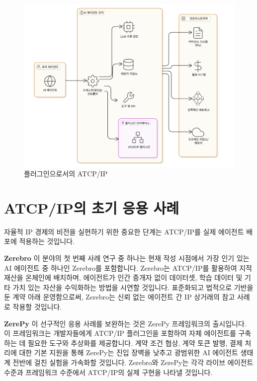 \documentclass[journal,onecolumn]{IEEEtran} %
\begin{document}
\begin{figure}[h!]
    \centering
    \includegraphics[width=\linewidth]{agendacore.png}
    \caption{플러그인으로서의 ATCP/IP}
    \label{fig:atcpip_plugin}
\end{figure}

\section{ATCP/IP의 초기 응용 사례}
자율적 IP 경제의 비전을 실현하기 위한 중요한 단계는 ATCP/IP를 실제 에이전트 배포에 적용하는 것입니다.

\noindent\textbf{Zerebro}
이 분야의 첫 번째 사례 연구 중 하나는 현재 작성 시점에서 가장 인기 있는 AI 에이전트 중 하나인 Zerebro\cite{ref9}를 포함합니다. Zerebro는 ATCP/IP를 활용하여 지적 재산을 온체인에 배치하며, 에이전트가 인간 중개자 없이 데이터셋, 학습 데이터 및 기타 가치 있는 자산을 수익화하는 방법을 시연할 것입니다. 표준화되고 법적으로 기반을 둔 계약 아래 운영함으로써, Zerebro는 신뢰 없는 에이전트 간 IP 상거래의 참고 사례로 작용할 것입니다.

\noindent\textbf{ZerePy}
이 선구적인 응용 사례를 보완하는 것은 ZerePy\cite{ref9} 프레임워크의 출시입니다. 이 프레임워크는 개발자들에게 ATCP/IP 플러그인을 포함하여 자체 에이전트를 구축하는 데 필요한 도구와 추상화를 제공합니다. 계약 조건 협상, 계약 토큰 발행, 결제 처리에 대한 기본 지원을 통해 ZerePy는 진입 장벽을 낮추고 광범위한 AI 에이전트 생태계 전반에 걸친 실험을 가속화할 것입니다. Zerebro와 ZerePy는 각각 라이브 에이전트 수준과 프레임워크 수준에서 ATCP/IP의 실제 구현을 나타낼 것입니다.
\end{document}

